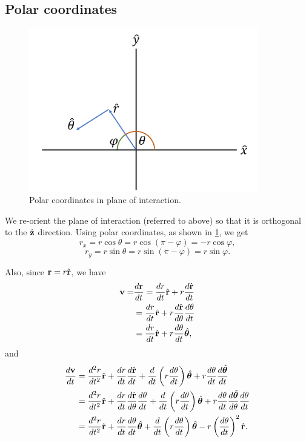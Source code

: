 \documentclass[a4paper,11pt]{report}
\begin{document}
\subsection{Polar coordinates}
\begin{figure}[ht]
    \centering
    \includegraphics[width=10cm]{../../images/polar_coordinates.png}
    \caption{Polar coordinates in plane of interaction.}
    \label{fig:polar_coordinates}
    \end{figure}

We re-orient the plane of interaction (referred to above) so that it is orthogonal to the $\hat{\mathbf{z}}$ direction. Using polar coordinates, as shown in \cref{fig:polar_coordinates}, we get
\begin{equation}
    r_x = r \cos \theta = r \cos ( \pi - \varphi ) = -r \cos \varphi,
\end{equation}
\begin{equation}
    r_y = r \sin \theta = r \sin ( \pi - \varphi ) = r \sin \varphi.
\end{equation}

Also, since $\mathbf{r} = r \hat{\mathbf{r}}$, we have
\begin{align}
    \mathbf{v} = &\frac{d \mathbf{r}}{dt} = \frac{dr}{dt} \hat{\mathbf{r}} + r \frac{d\hat{\mathbf{r}}}{dt} \nonumber \\
    &= \frac{d r}{dt} \hat{\mathbf{r}} + r \frac{d\hat{\mathbf{r}}}{d\theta} \frac{d\theta}{dt} \nonumber \\
    &= \frac{dr}{dt} \hat{\mathbf{r}} + r \frac{d \theta}{dt} \hat{\bm{\theta}},
\end{align}
and
\begin{align}
    \frac{d \mathbf{v}}{dt} &= \frac{d^2r}{dt^2} \hat{\mathbf{r}} + \frac{dr}{dt} \frac{d\hat{\mathbf{r}}}{dt} + \frac{d}{dt} \left ( r \frac{d\theta}{dt} \right ) \hat{\bm{\theta}} + r \frac{d \theta}{dt} \frac{d \hat{\bm{\theta}}}{dt} \nonumber \\
    &= \frac{d^2 r}{dt^2} \hat{\mathbf{r}} + \frac{dr}{dt} \frac{d\hat{\mathbf{r}}}{d\theta} \frac{d\theta}{dt} + \frac{d}{dt} \left ( r \frac{d\theta}{dt} \right ) \hat{\bm{\theta}} + r \frac{d \theta}{dt} \frac{d \hat{\bm{\theta}}}{d\theta} \frac{d \theta}{dt} \nonumber \\
    &= \frac{d^2r}{dt^2} \hat{\mathbf{r}} + \frac{dr}{dt} \frac{d\theta}{dt} \hat{\bm{\theta}} + \frac{d}{dt} \left ( r \frac{d\theta}{dt} \right ) \hat{\bm{\theta}} - r \left ( \frac{d\theta}{dt} \right ) ^2 \hat{\mathbf{r}}.
\end{align}
\end{document}
